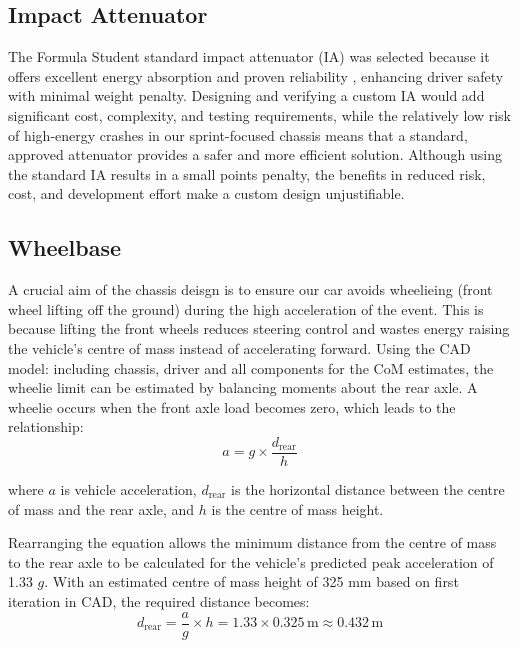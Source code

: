 \subsection{Impact Attenuator}

The Formula Student standard impact attenuator (IA) \cite{fsae_rules_2025} was selected because it offers excellent energy absorption and proven reliability \cite{dewesoft2025ia}, enhancing driver safety with minimal weight penalty. Designing and verifying a custom IA would add significant cost, complexity, and testing requirements, while the relatively low risk of high-energy crashes in our sprint-focused chassis means that a standard, approved attenuator provides a safer and more efficient solution. Although using the standard IA results in a small points penalty, the benefits in reduced risk, cost, and development effort make a custom design unjustifiable.

\subsection{Wheelbase}
\label{sec:wheelbase_mass_distribution}

A crucial aim of the chassis deisgn is to ensure our car avoids wheelieing (front wheel lifting off the ground) during the high acceleration of the event. This is because lifting the front wheels reduces steering control and wastes energy raising the vehicle’s centre of mass instead of accelerating forward. Using the CAD model: including chassis, driver and all components for the  CoM estimates, the wheelie limit can be estimated by balancing moments about the rear axle. A wheelie occurs when the front axle load becomes zero, which leads to the relationship:
\vspace{-2pt}
\begin{equation}
    a = g \times \frac{d_{\text{rear}}}{h}
\end{equation}

where \( a \) is vehicle acceleration, \( d_{\text{rear}} \) is the horizontal distance between the centre of mass and the rear axle, and \( h \) is the centre of mass height.

Rearranging the equation allows the minimum distance from the centre of mass to the rear axle to be calculated for the vehicle’s predicted peak acceleration of 1.33 \( g\). With an estimated centre of mass height of 325 mm based on first iteration in CAD, the required distance becomes:
 \vspace{-2pt}
\begin{equation}
    d_{\text{rear}} = \frac{a}{g} \times h = 1.33 \times 0.325\,\text{m} \approx 0.432\,\text{m}
\end{equation}


